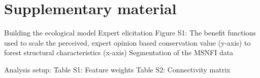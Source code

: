 \clearpage

\section{Supplementary material}

Building the ecological model Expert elicitation Figure S1: The benefit
functions used to scale the perceived, expert opinion based conservation
value (y-axis) to forest structural characteristics (x-axis)
Segmentation of the MSNFI data

Analysis setup: Table S1: Feature weights Table S2: Connectivity matrix
